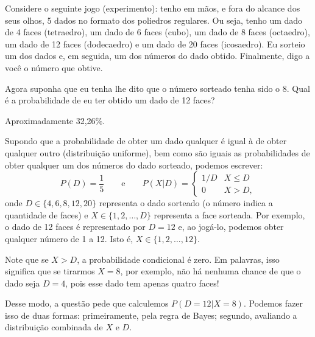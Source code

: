 
\newcommand\qsection[1]{\bigskip\noindent\begingroup\sffamily\bfseries#1\endgroup\par\smallskip}

\begin{question}
  Considere o seguinte jogo (experimento):
  tenho em mãos, e fora do alcance dos seus olhos, 5 dados no formato dos poliedros regulares.
  Ou seja, tenho um dado de 4 faces (tetraedro), um dado de 6 faces (cubo), um dado de 8 faces (octaedro), um dado de 12 faces (dodecaedro) e um dado de 20 faces (icosaedro).
  Eu sorteio um dos dados e, em seguida, um dos números do dado obtido.
  Finalmente, digo a você o número que obtive.

  Agora suponha que eu tenha lhe dito que o número sorteado tenha sido o 8.
  Qual é a probabilidade de eu ter obtido um dado de 12 faces?

  \begin{answer}
    Aproximadamente 32,26\%.
  \end{answer}

  \begin{solution}
    Supondo que a probabilidade de obter um dado qualquer é igual à de obter qualquer outro (distribuição uniforme), bem como são iguais as probabilidades de obter qualquer um dos números do dado sorteado, podemos escrever:
    \begin{equation}\label{eq:probabilidades}
      P(D) = \frac{1}{5} \qquad\text{e}\qquad
      P(X|D) = \begin{cases}
        1/D & X \le D \\
        0   & X > D,
      \end{cases}
    \end{equation}
    onde $D \in \{4, 6, 8, 12, 20\}$ representa o dado sorteado (o número indica a quantidade de faces) e $X \in \{1, 2, \ldots, D\}$ representa a face sorteada.
    Por exemplo, o dado de 12 faces é representado por $D = 12$ e, ao jogá-lo, podemos obter qualquer número de 1 a 12.
    Isto é, $X \in \{1, 2, \ldots, 12\}$.

    Note que se $X > D$, a probabilidade condicional é zero.
    Em palavras, isso significa que se tirarmos $X = 8$, por exemplo, não há nenhuma chance de que o dado seja $D = 4$, pois esse dado tem apenas quatro faces!

    Desse modo, a questão pede que calculemos $P(D=12|X=8)$.
    Podemos fazer isso de duas formas: primeiramente, pela regra de Bayes;
    segundo, avaliando a distribuição combinada de $X$ e $D$.


\end{solution}
\end{question}
